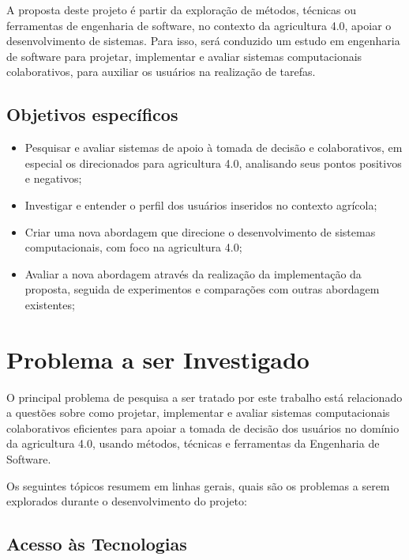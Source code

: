 \documentclass[12pt]{article}
\begin{document}
A proposta deste projeto é partir da exploração de métodos, técnicas ou ferramentas de engenharia de software, no contexto da agricultura 4.0, apoiar o desenvolvimento de sistemas. Para isso, será conduzido um estudo em engenharia de software para projetar, implementar e avaliar sistemas computacionais colaborativos, para auxiliar os usuários na realização de tarefas.

\subsection{Objetivos específicos}
\label{subsec:objetivos_especificos}

\begin{itemize}
	\item Pesquisar e avaliar sistemas de apoio à tomada de decisão e colaborativos, em especial os direcionados para agricultura 4.0, analisando seus pontos positivos e negativos;
	\item Investigar e entender o perfil dos usuários inseridos no contexto agrícola;
	\item Criar uma nova abordagem que direcione o desenvolvimento de sistemas computacionais, com foco na agricultura 4.0;
	\item Avaliar a nova abordagem através da realização da implementação da proposta, seguida de experimentos e comparações com outras abordagem existentes;
\end{itemize}

\section{Problema a ser Investigado}
\label{sec:problema_investigado}

O principal problema de pesquisa a ser tratado por este trabalho está relacionado a questões sobre como projetar, implementar e avaliar sistemas computacionais colaborativos eficientes para apoiar a tomada de decisão dos usuários no domínio da agricultura 4.0, usando métodos, técnicas e ferramentas da Engenharia de Software.

Os seguintes tópicos resumem em linhas gerais, quais são os problemas a serem explorados durante o desenvolvimento do projeto:

\subsection{Acesso às Tecnologias}
\label{subsec:acesso_tecnologias}
\end{document}
